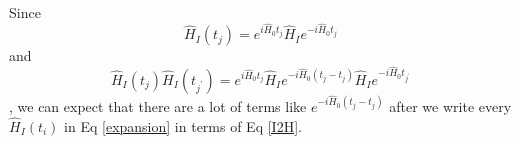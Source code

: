 \documentclass[bachelor, english]{ustcthesis}
\begin{document}
Since
\begin{equation} \label{I2H}
\hat{H}_{I}\left(t_{j}\right)=e^{i \hat{H}_{0} t_{j}} \hat{H}_{I} e^{-i \hat{H}_{0} t_{j}}
\end{equation}
and 
$$
\hat{H}_{I}\left(t_{j}\right) \hat{H}_{I}\left(t_{j^{\prime}}\right)=e^{i \hat{H}_{0} t_{j}} \hat{H}_{I} e^{-i \hat{H}_{0}\left(t_{j}-t_{j}\right)} \hat{H}_{I} e^{-i \hat{H}_{0} t_{j^{\prime}}}
$$
, we can expect that there are a lot of terms like $e^{-i \hat{H}_{0}\left(t_{j}-t_{j}\right)}$ after we write every $\hat{H}_I(t_i)$ in Eq \ref{expansion} in terms of Eq \ref{I2H}.






\appendix


\backmatter


\end{document}
